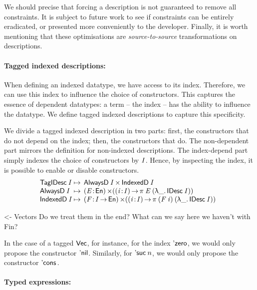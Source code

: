 We should precise that forcing a description is not guaranteed to
remove all constraints. It is subject to future work to see if
constraints can be entirely eradicated, or presented more conveniently
to the developer.  Finally, it is worth mentioning that these
optimisations are \emph{source-to-source} transformations on
descriptions.

\paragraph{Tagged indexed descriptions:}

When defining an indexed datatype, we have access to its
index. Therefore, we can use this index to influence the choice of
constructors. This captures the essence of dependent datatypes: a
term -- the index -- has the ability to influence the datatype. We
define tagged indexed descriptions to capture this specificity.

We divide a tagged indexed description in two parts: first, the
constructors that do not depend on the index; then, the constructors
that do. The non-dependent part mirrors the definition for non-indexed
descriptions. The index-depend part simply indexes the choice of
constructors by $\V{I}$. Hence, by inspecting the index, it is
possible to enable or disable constructors.
%
\[
\begin{array}{@{}l@{\:\mapsto\:\:}l}
 \TagIDesc{\V{I}}  & \TIMES{\ATagIDesc{\V{I}}}{\ITagIDesc{\V{I}}} \\
 \ATagIDesc{\V{I}} & \SIGMA{\V{E}}{\EnumU} (\PI{\V{i}}{\V{I}} \spi{\V{E}}{(\LAM{\_} \IDesc{\V{I}})}) \\
 \ITagIDesc{\V{I}} & 
     \SIGMA{\V{F}}{\V{I} \To \EnumU} (\PI{\V{i}}{\V{I}} \spi{(\V{F}\: \V{i})}{(\LAM{\_} \IDesc{\V{I}})}) 
\end{array}
\]

\begin{wstructure}
<- Vectors
    Do we treat them in the end? 
    What can we say here we haven't with Fin?
\end{wstructure}

In the case of a tagged $\D{Vec}$, for instance, for the index
$\NatZero$, we would only propose the constructor
$\ListNil$. Similarly, for $\NatSuc{n}$, we would only propose the
constructor $\ListCons{\!}{\!}$.
 
\paragraph{Typed expressions:}


